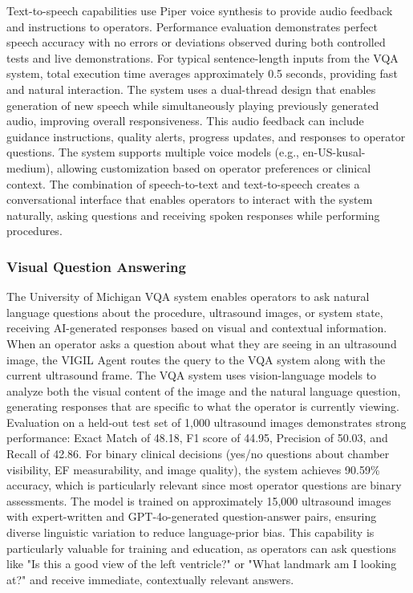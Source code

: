 \documentclass[12pt,a4paper]{article}
\begin{document}
Text-to-speech capabilities use Piper voice synthesis to provide audio feedback and instructions to operators. Performance evaluation demonstrates perfect speech accuracy with no errors or deviations observed during both controlled tests and live demonstrations. For typical sentence-length inputs from the VQA system, total execution time averages approximately 0.5 seconds, providing fast and natural interaction. The system uses a dual-thread design that enables generation of new speech while simultaneously playing previously generated audio, improving overall responsiveness. This audio feedback can include guidance instructions, quality alerts, progress updates, and responses to operator questions. The system supports multiple voice models (e.g., en-US-kusal-medium), allowing customization based on operator preferences or clinical context. The combination of speech-to-text and text-to-speech creates a conversational interface that enables operators to interact with the system naturally, asking questions and receiving spoken responses while performing procedures.

\subsubsection{Visual Question Answering}

The University of Michigan VQA system enables operators to ask natural language questions about the procedure, ultrasound images, or system state, receiving AI-generated responses based on visual and contextual information. When an operator asks a question about what they are seeing in an ultrasound image, the VIGIL Agent routes the query to the VQA system along with the current ultrasound frame. The VQA system uses vision-language models to analyze both the visual content of the image and the natural language question, generating responses that are specific to what the operator is currently viewing. Evaluation on a held-out test set of 1,000 ultrasound images demonstrates strong performance: Exact Match of 48.18, F1 score of 44.95, Precision of 50.03, and Recall of 42.86. For binary clinical decisions (yes/no questions about chamber visibility, EF measurability, and image quality), the system achieves 90.59\% accuracy, which is particularly relevant since most operator questions are binary assessments. The model is trained on approximately 15,000 ultrasound images with expert-written and GPT-4o-generated question-answer pairs, ensuring diverse linguistic variation to reduce language-prior bias. This capability is particularly valuable for training and education, as operators can ask questions like "Is this a good view of the left ventricle?" or "What landmark am I looking at?" and receive immediate, contextually relevant answers.
\end{document}
